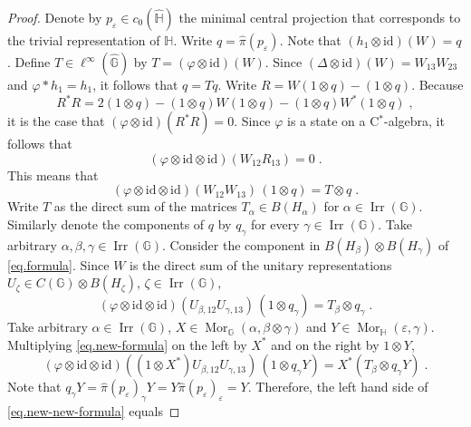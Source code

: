 \documentclass[12pt]{amsart}
\theoremstyle{remark}
\theoremstyle{remark}
\begin{document}
\begin{proof}
Denote by $p_\varepsilon \in c_0(\widehat{\mathbb{H}})$ the minimal central projection that corresponds to the trivial representation of $\mathbb{H}$. Write $q = \widehat{\pi}(p_\varepsilon)$. Note that $(h_1 \otimes \mathrm{id})(W) = q$. Define $T \in \ell^\infty(\widehat{\mathbb{G}})$ by $T = (\varphi \otimes \mathrm{id})(W)$. Since $(\Delta \otimes \mathrm{id})(W) = W_{13} W_{23}$ and $\varphi \ast h_1 = h_1$, it follows that $q = T q$. Write $R = W(1 \otimes q) - (1 \otimes q)$. Because
$$R^* R = 2 (1 \otimes q) - (1 \otimes q) W (1 \otimes q) - (1 \otimes q) W^* (1 \otimes q) \; ,$$
it is the case that $(\varphi \otimes \mathrm{id})(R^* R) = 0$. Since $\varphi$ is a state on a C$^*$-algebra, it follows that
$$(\varphi \otimes \mathrm{id} \otimes \mathrm{id})(W_{12} R_{13}) = 0 \; .$$
This means that
\begin{equation}\label{eq.formula}
(\varphi \otimes \mathrm{id} \otimes \mathrm{id})(W_{12} W_{13}) \, (1 \otimes q) = T \otimes q \; .
\end{equation}
Write $T$ as the direct sum of the matrices $T_\alpha \in B(H_\alpha)$ for $\alpha \in \operatorname{Irr}(\mathbb{G})$. Similarly denote the components of $q$ by $q_\gamma$ for every $\gamma \in \operatorname{Irr}(\mathbb{G})$. Take arbitrary $\alpha,\beta,\gamma \in \operatorname{Irr}(\mathbb{G})$. Consider the component in $B(H_\beta) \otimes B(H_\gamma)$ of \eqref{eq.formula}. Since $W$ is the direct sum of the unitary representations $U_\zeta \in C(\mathbb{G}) \otimes B(H_\zeta)$, $\zeta \in \operatorname{Irr}(\mathbb{G})$,
\begin{equation}\label{eq.new-formula}
(\varphi \otimes \mathrm{id} \otimes \mathrm{id})(U_{\beta,12} U_{\gamma,13}) \, (1 \otimes q_\gamma) = T_\beta \otimes q_\gamma \; .
\end{equation}
Take arbitrary $\alpha \in \operatorname{Irr}(\mathbb{G})$, $X \in \operatorname{Mor}_\mathbb{G}(\alpha,\beta \otimes \gamma)$ and $Y \in \operatorname{Mor}_\mathbb{H}(\varepsilon,\gamma)$. Multiplying \eqref{eq.new-formula} on the left by $X^*$ and on the right by $1 \otimes Y$,
\begin{equation}\label{eq.new-new-formula}
(\varphi \otimes \mathrm{id} \otimes \mathrm{id})((1 \otimes X^*) U_{\beta,12} U_{\gamma,13}) \, (1 \otimes q_\gamma Y) = X^*(T_\beta \otimes q_\gamma Y) \; .
\end{equation}
Note that $q_\gamma Y = \widehat{\pi}(p_\varepsilon)_\gamma Y = Y \widehat{\pi}(p_\varepsilon)_\varepsilon = Y$. Therefore, the left hand side of \eqref{eq.new-new-formula} equals

\end{proof}
\end{document}
